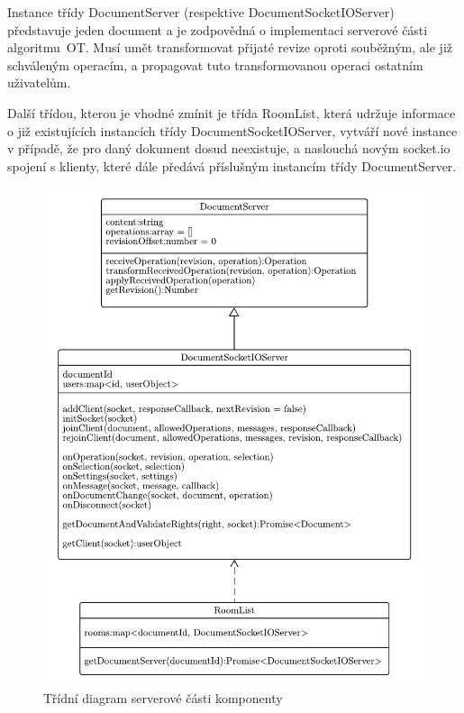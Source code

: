 Instance třídy DocumentServer (respektive DocumentSocketIOServer) představuje jeden document a je zodpovědná o implementaci serverové části algoritmu~\gls{OT}.
Musí umět transformovat přijaté revize oproti souběžným, ale již schváleným operacím, a propagovat tuto transformovanou operaci ostatním uživatelům.

Další třídou, kterou je vhodné zmínit je třída RoomList, která udržuje informace o již existujících instancích třídy DocumentSocketIOServer, vytváří nové instance v případě, že pro daný dokument dosud neexistuje, a naslouchá novým socket.io spojení s klienty, které dále předává příslušným instancím třídy DocumentServer.

\begin{figure}[ht!]
    \centering
    \includegraphics[width=\textwidth]{partials/navrh/DocumentServer.pdf}
    \caption{Třídní diagram serverové části komponenty}\label{fig:DocumentServer}
\end{figure}
